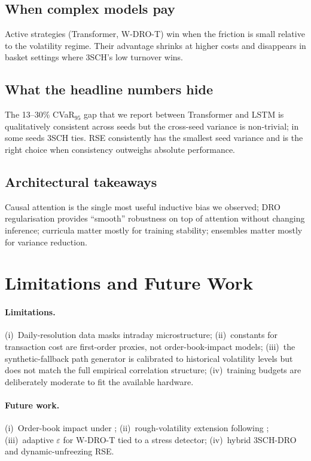 \documentclass[11pt,a4paper]{article}
\begin{document}
\subsection{When complex models pay}
Active strategies (Transformer, W-DRO-T) win when the friction is small
relative to the volatility regime.  Their advantage shrinks at higher
costs and disappears in basket settings where 3SCH's low turnover wins.

\subsection{What the headline numbers hide}
The 13--30\% CVaR$_{95}$ gap that we report between Transformer and LSTM
is qualitatively consistent across seeds but the cross-seed variance is
non-trivial; in some seeds 3SCH ties.  RSE consistently has the smallest
seed variance and is the right choice when consistency outweighs
absolute performance.

\subsection{Architectural takeaways}
Causal attention is the single most useful inductive bias we observed;
DRO regularisation provides ``smooth'' robustness on top of attention
without changing inference; curricula matter mostly for training stability;
ensembles matter mostly for variance reduction.

\section{Limitations and Future Work}\label{sec:future}

\paragraph{Limitations.}
(i)~Daily-resolution data masks intraday microstructure;
(ii)~constants for transaction cost are first-order proxies, not
order-book-impact models;
(iii)~the synthetic-fallback path generator is calibrated to historical
volatility levels but does not match the full empirical correlation
structure;
(iv)~training budgets are deliberately moderate to fit the available
hardware.

\paragraph{Future work.}
(i)~Order-book impact under \citet{pickard2025rl};
(ii)~rough-volatility extension following \citet{horvath2021deep};
(iii)~adaptive $\varepsilon$ for W-DRO-T tied to a stress detector;
(iv)~hybrid 3SCH-DRO and dynamic-unfreezing RSE.
\end{document}
